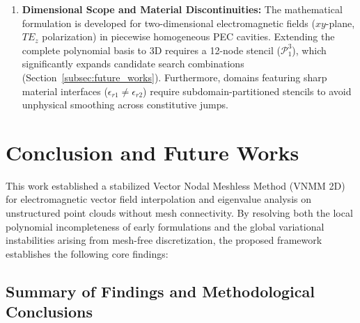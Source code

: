 \documentclass[preprint,12pt]{elsarticle}
\begin{document}
\begin{enumerate}
    \item \textbf{Dimensional Scope and Material Discontinuities:}
          The mathematical formulation is developed for two-dimensional electromagnetic fields ($xy$-plane, $TE_z$ polarization) in piecewise homogeneous PEC cavities. Extending the complete polynomial basis to 3D requires a 12-node stencil ($\mathcal{P}_1^3$), which significantly expands candidate search combinations (Section~\ref{subsec:future_works}). Furthermore, domains featuring sharp material interfaces ($\epsilon_{r1} \neq \epsilon_{r2}$) require subdomain-partitioned stencils to avoid unphysical smoothing across constitutive jumps.
\end{enumerate}

\section{Conclusion and Future Works}
\label{sec:conclusion}

This work established a stabilized Vector Nodal Meshless Method (VNMM 2D) for electromagnetic vector field interpolation and eigenvalue analysis on unstructured point clouds without mesh connectivity. By resolving both the local polynomial incompleteness of early formulations and the global variational instabilities arising from mesh-free discretization, the proposed framework establishes the following core findings:

\subsection{Summary of Findings and Methodological Conclusions}
\label{subsec:summary_conclusions}
\end{document}
